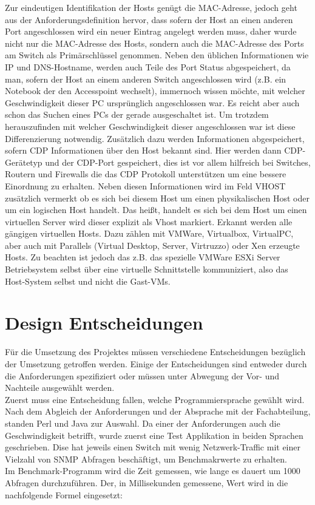 Zur eindeutigen Identifikation der Hosts genügt die MAC-Adresse, jedoch geht aus der Anforderungsdefinition hervor, dass sofern der Host an einen anderen Port angeschlossen wird ein neuer Eintrag angelegt werden muss, daher wurde nicht nur die MAC-Adresse des Hosts, sondern auch die MAC-Adresse des Ports am Switch als Primärschlüssel genommen. Neben den üblichen Informationen wie IP und DNS-Hostname, werden auch Teile des Port Status abgespeichert, da man, sofern der Host an einem anderen Switch angeschlossen wird (z.B. ein Notebook der den Accesspoint wechselt), immernoch wissen möchte, mit welcher Geschwindigkeit dieser PC ursprünglich angeschlossen war. Es reicht aber auch schon das Suchen eines PCs der gerade ausgeschaltet ist. Um trotzdem herauszufinden mit welcher Geschwindigkeit dieser angeschlossen war ist diese Differenzierung notwendig. Zusätzlich dazu werden Informationen abgespeichert, sofern CDP Informationen über den Host bekannt sind. Hier werden dann CDP-Gerätetyp und der CDP-Port gespeichert, dies ist vor allem hilfreich bei Switches, Routern und Firewalls die das CDP Protokoll unterstützen um eine bessere Einordnung zu erhalten. Neben diesen Informationen wird im Feld VHOST zusätzlich vermerkt ob es sich bei diesem Host um einen physikalischen Host oder um ein logischen Host handelt. Das heißt, handelt es sich bei dem Host um einen virtuellen Server wird dieser explizit als Vhost markiert. Erkannt werden alle gängigen virtuellen Hosts. Dazu zählen mit VMWare, Virtualbox, VirtualPC, aber auch mit Parallels (Virtual Desktop, Server, Virtruzzo) oder Xen erzeugte Hosts. Zu beachten ist jedoch das z.B. das spezielle VMWare ESXi Server Betriebsystem selbst über eine virtuelle Schnittstelle kommuniziert, also das Host-System selbst und nicht die Gast-VMs.


\section{Design Entscheidungen}
\label{sec:designent}

Für die Umsetzung des Projektes müssen verschiedene Entscheidungen bezüglich der Umsetzung getroffen werden. Einige der Entscheidungen sind entweder durch die Anforderungen spezifiziert oder müssen unter Abwegung der Vor- und Nachteile ausgewählt werden.\\
Zuerst muss eine Entscheidung fallen, welche Programmiersprache gewählt wird. Nach dem Abgleich der Anforderungen und der Absprache mit der Fachabteilung, standen Perl und Java zur Auswahl. Da einer der Anforderungen auch die Geschwindigkeit betrifft, wurde zuerst eine Test Applikation in beiden Sprachen geschrieben. Dise hat jeweils einen Switch mit wenig Netzwerk-Traffic mit einer Vielzahl von SNMP Abfragen beschäftigt, um Benchmakrwerte zu erhalten.\\
Im Benchmark-Programm wird die Zeit gemessen, wie lange es dauert um 1000 Abfragen durchzuführen.
Der, in Millisekunden gemessene, Wert wird in die nachfolgende Formel eingesetzt:\\

